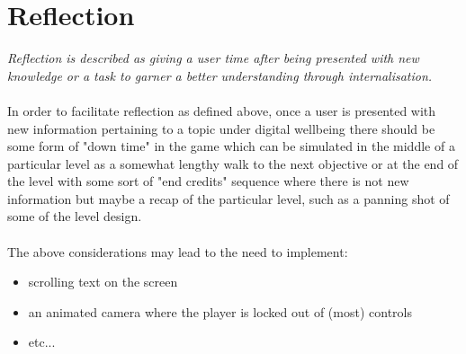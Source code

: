 \documentclass[a4paper]{scrreprt}
\begin{document}
\section{Reflection}
\textit{Reflection is described as giving a user time after being presented with new knowledge or a task to garner a better understanding through internalisation.}
\\\\
In order to facilitate reflection as defined above, once a user is presented with new information pertaining to a topic under digital wellbeing there should be some form of "down time" in the game which can be simulated in the middle of a particular level as a somewhat lengthy walk to the next objective or at the end of the level with some sort of "end credits" sequence where there is not new information but maybe a recap of the particular level, such as a panning shot of some of the level design.
\\\\
The above considerations may lead to the need to implement:
\begin{itemize}
\item scrolling text on the screen
\item an animated camera where the player is locked out of (most) controls
\item etc...
\end{itemize}
\end{document}

